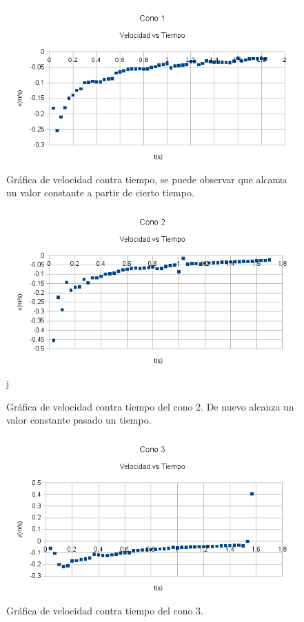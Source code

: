 \begin{figure}[h!]
    \centering
    \includegraphics{vel_cono1}
    \caption{Gráfica de velocidad contra tiempo, se puede observar
    que alcanza un valor constante a partir de cierto tiempo.}
    \label{fig:VelCono1}
\end{figure}

\begin{figure}[h!]
    \centering
    \includegraphics{vel_cono2}j
    \caption{Gráfica de velocidad contra tiempo del cono 2. De nuevo 
    alcanza un valor constante pasado un tiempo.}
    \label{fig:VelCono2}
\end{figure}

\begin{figure}[h!]
    \centering
    \includegraphics{vel_cono3}
    \caption{Gráfica de velocidad contra tiempo del cono 3.}
    \label{fig:VelCono3}
\end{figure}
